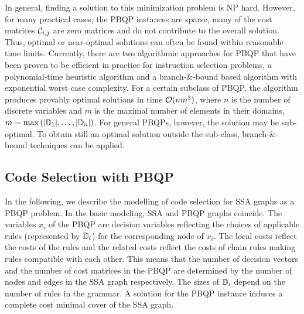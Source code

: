In general, finding a solution to this minimization problem is NP
hard.  However, for many practical cases, the PBQP instances are
sparse, \ie many of the cost matrices ${\mathcal C}_{i,j}$ are zero
matrices and do not contribute to the overall solution. Thus, optimal
or near-optimal solutions can often be found within reasonable time
limits.  Currently, there are two algorithmic approaches for PBQP that
have been proven to be efficient in practice for instruction selection
problems, \ie a polynomial-time heuristic algorithm and a
branch-\&-bound based algorithm with exponential worst case
complexity.  For a certain subclass of PBQP, the algorithm produces
provably optimal solutions in time ${\cal O}(n m^3)$, where $n$ is the
number of discrete variables and $m$ is the maximal number of elements
in their domains, \ie $m=\max
\left(|\mathbb D_1|,\ldots,|\mathbb D_n\right|)$. For general
{PBQP}s, however, the solution may be sub-optimal. To obtain still an
optimal solution outside the sub-class, branch-\&-bound techniques can
be applied.

\subsection{Code Selection with PBQP}
In the following, we describe the modelling of code selection for SSA
graphs as a PBQP problem.  In the basic modeling, SSA and PBQP graphs
coincide.  The variables $x_i$ of the PBQP are decision variables
reflecting the choices of applicable rules (represented by
$\mathbb D_i$) for the corresponding node of $x_i$. The local costs
reflect the costs of the rules and the related costs reflect the costs
of chain rules making rules compatible with each other.  This means
that the number of decision vectors and the number of cost matrices in
the PBQP are determined by the number of nodes and edges in the SSA
graph respectively.  The sizes of $\mathbb D_i$ depend on the number
of rules in the grammar. A solution for the PBQP instance induces a
complete cost minimal cover of the SSA graph.

